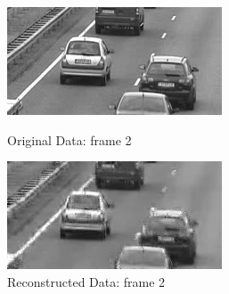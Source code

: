 \documentclass[12pt]{article}
\begin{document}
\begin{itemize}
\begin{enumerate}
    \begin{figure}[H]
        \centering
        \begin{minipage}{.45\textwidth}
            \centering
            \includegraphics[width=\linewidth]{results/cars_3_orig_2.png}
            \caption*{Original Data: frame 2}
        \end{minipage}
        \begin{minipage}{.45\textwidth}
            \centering
            \includegraphics[width=\linewidth]{results/cars_3_recon_2.png}
            \caption*{Reconstructed Data: frame 2}
        \end{minipage}
    \end{figure}


\end{enumerate}
\end{itemize}
\end{document}
